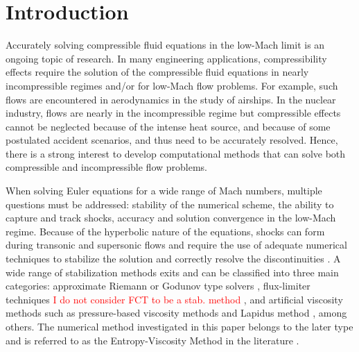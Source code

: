 \documentclass[review,10pt]{elsarticle}
\newcommand{\tcr}[1]{\textcolor{red}{#1}}
\begin{document}
\section{Introduction} \label{sec:intro}

Accurately solving compressible fluid equations in the low-Mach limit is an ongoing topic of research. 
In many engineering applications, compressibility effects require the solution of the compressible fluid equations
in nearly incompressible regimes and/or for low-Mach flow problems. For example, such flows are encountered 
in aerodynamics in the study of airships. In the nuclear industry, flows are nearly in the incompressible regime but 
compressible effects cannot be neglected because of the intense heat source, and because of some postulated accident scenarios, 
and thus need to be accurately resolved. Hence, there is a strong interest to develop computational methods 
that can solve both compressible and incompressible flow problems.  

When solving Euler equations for a wide range of Mach numbers, multiple questions must be addressed: stability of the numerical scheme, 
the ability to capture and track shocks, accuracy and solution convergence in the low-Mach regime. Because of the hyperbolic nature of the equations, 
shocks can form during transonic and supersonic flows and require the use of adequate numerical techniques to stabilize the solution
and correctly resolve the discontinuities \cite{lax-peter, harten-hyman}. 
A wide range of stabilization methods exits  and can be classified into three main categories: approximate Riemann or Godunov type solvers \cite{Toro}, flux-limiter techniques \tcr{I do not consider FCT to be a stab. method}
\cite{FluxLimiter, FluxLimiter2, fct-zalesak, fct-kuzmin-lohner}, and artificial viscosity methods \cite{neumann} such as pressure-based viscosity methods \cite{PBV_book} and Lapidus method \cite{Lapidus_paper, LMP, Lapidus_book}, among others. The numerical method investigated in this paper belongs to the later type and is referred to as the Entropy-Viscosity Method  in the literature \cite{jlg1, jlg2}.
\end{document}
